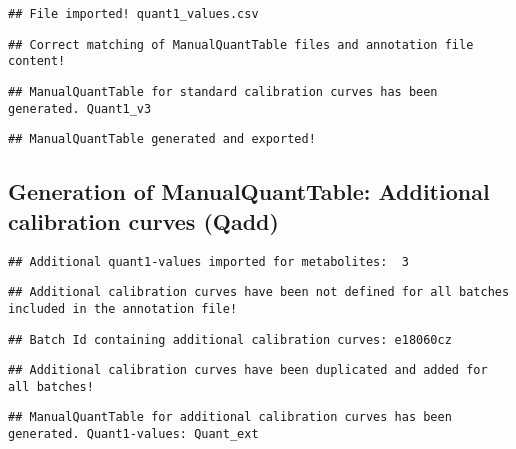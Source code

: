 \documentclass[9pt,]{article}
\begin{document}
\begin{verbatim}
## File imported! quant1_values.csv
\end{verbatim}

\begin{verbatim}
## Correct matching of ManualQuantTable files and annotation file content!
\end{verbatim}

\begin{verbatim}
## ManualQuantTable for standard calibration curves has been generated. Quant1_v3
\end{verbatim}

\begin{verbatim}
## ManualQuantTable generated and exported!
\end{verbatim}

\subsection{Generation of ManualQuantTable: Additional calibration
curves
(Qadd)}\label{generation-of-manualquanttable-additional-calibration-curves-qadd}

\begin{verbatim}
## Additional quant1-values imported for metabolites:  3
\end{verbatim}

\begin{verbatim}
## Additional calibration curves have been not defined for all batches included in the annotation file!
\end{verbatim}

\begin{verbatim}
## Batch Id containing additional calibration curves: e18060cz
\end{verbatim}

\begin{verbatim}
## Additional calibration curves have been duplicated and added for all batches!
\end{verbatim}

\begin{verbatim}
## ManualQuantTable for additional calibration curves has been generated. Quant1-values: Quant_ext
\end{verbatim}
\end{document}
